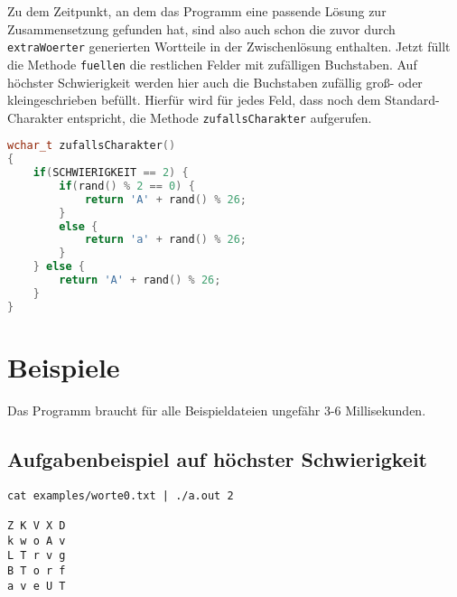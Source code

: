 \documentclass[a4paper,10pt,ngerman]{scrartcl}
\begin{document}
Zu dem Zeitpunkt, an dem das Programm eine passende Lösung zur Zusammensetzung gefunden hat, sind also auch schon die zuvor durch \lstinline{extraWoerter} generierten Wortteile in der Zwischenlösung enthalten.
Jetzt füllt die Methode \lstinline{fuellen} die restlichen Felder mit zufälligen Buchstaben. 
Auf höchster Schwierigkeit werden hier auch die Buchstaben zufällig groß- oder kleingeschrieben befüllt.
Hierfür wird für jedes Feld, dass noch dem Standard-Charakter entspricht, die Methode \lstinline{zufallsCharakter} aufgerufen.

\begin{lstlisting}[language=C++]
wchar_t zufallsCharakter()
{
    if(SCHWIERIGKEIT == 2) {
        if(rand() % 2 == 0) {
            return 'A' + rand() % 26;
        }
        else {
            return 'a' + rand() % 26;
        }
    } else {
        return 'A' + rand() % 26;
    }
}
\end{lstlisting}

\section{Beispiele}
Das Programm braucht für alle Beispieldateien ungefähr 3-6 Millisekunden.
\subsection{Aufgabenbeispiel auf höchster Schwierigkeit}
\begin{lstlisting}
cat examples/worte0.txt | ./a.out 2

Z K V X D
k w o A v
L T r v g
B T o r f
a v e U T
\end{lstlisting}
\end{document}
